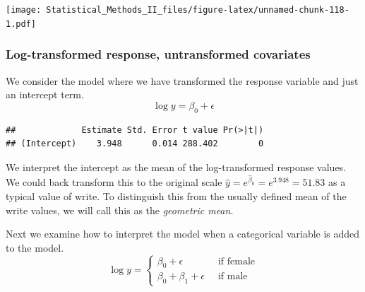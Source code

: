 \documentclass[]{book}
\newenvironment{Shaded}{\begin{snugshade}}{\end{snugshade}}
\newcommand{\KeywordTok}[1]{\textcolor[rgb]{0.13,0.29,0.53}{\textbf{{#1}}}}
\newcommand{\DataTypeTok}[1]{\textcolor[rgb]{0.13,0.29,0.53}{{#1}}}
\newcommand{\DecValTok}[1]{\textcolor[rgb]{0.00,0.00,0.81}{{#1}}}
\newcommand{\StringTok}[1]{\textcolor[rgb]{0.31,0.60,0.02}{{#1}}}
\newcommand{\NormalTok}[1]{{#1}}
\theoremstyle{definition}
\theoremstyle{definition}
\theoremstyle{remark}
\begin{document}
\texttt{[image: Statistical\_Methods\_II\_files/figure-latex/unnamed-chunk-118-1.pdf]}

\subsubsection{Log-transformed response, untransformed
covariates}\label{log-transformed-response-untransformed-covariates}

We consider the model where we have transformed the response variable
and just an intercept term. \[\log y=\beta_{0}+\epsilon\]

\begin{Shaded}
\end{Shaded}

\begin{verbatim}
##             Estimate Std. Error t value Pr(>|t|)
## (Intercept)    3.948      0.014 288.402        0
\end{verbatim}

We interpret the intercept as the mean of the log-transformed response
values. We could back transform this to the original scale
\(\hat{y} = e^{\hat{\beta}_{0}} = e^{3.948} = 51.83\) as a typical value
of write. To distinguish this from the usually defined mean of the write
values, we will call this as the \emph{geometric mean}.

Next we examine how to interpret the model when a categorical variable
is added to the model. \[\log y=\begin{cases}
\beta_{0}+\epsilon & \;\;\textrm{if female}\\
\beta_{0}+\beta_{1}+\epsilon & \;\;\textrm{if male}
\end{cases}\]

\begin{Shaded}
\end{Shaded}
\end{document}
